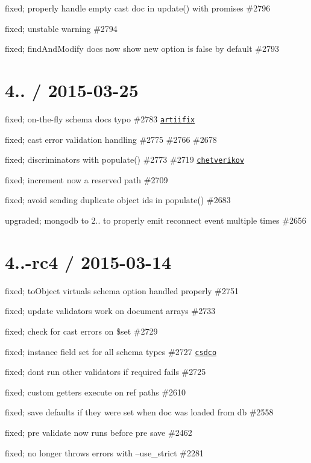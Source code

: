 \begin{DoxyItemize}
\item fixed; properly handle empty cast doc in update() with promises \#2796
\item fixed; unstable warning \#2794
\item fixed; find\+And\+Modify docs now show new option is false by default \#2793
\end{DoxyItemize}

\section*{4.. / 2015-\/03-\/25 }


\begin{DoxyItemize}
\item fixed; on-\/the-\/fly schema docs typo \#2783 \href{https://github.com/artiifix}{\tt artiifix}
\item fixed; cast error validation handling \#2775 \#2766 \#2678
\item fixed; discriminators with populate() \#2773 \#2719 \href{https://github.com/chetverikov}{\tt chetverikov}
\item fixed; increment now a reserved path \#2709
\item fixed; avoid sending duplicate object ids in populate() \#2683
\item upgraded; mongodb to 2.. to properly emit reconnect event multiple times \#2656
\end{DoxyItemize}

\section*{4..-\/rc4 / 2015-\/03-\/14 }


\begin{DoxyItemize}
\item fixed; to\+Object virtuals schema option handled properly \#2751
\item fixed; update validators work on document arrays \#2733
\item fixed; check for cast errors on \$set \#2729
\item fixed; instance field set for all schema types \#2727 \href{https://github.com/csdco}{\tt csdco}
\item fixed; dont run other validators if required fails \#2725
\item fixed; custom getters execute on ref paths \#2610
\item fixed; save defaults if they were set when doc was loaded from db \#2558
\item fixed; pre validate now runs before pre save \#2462
\item fixed; no longer throws errors with --use\+\_\+strict \#2281
\end{DoxyItemize}

